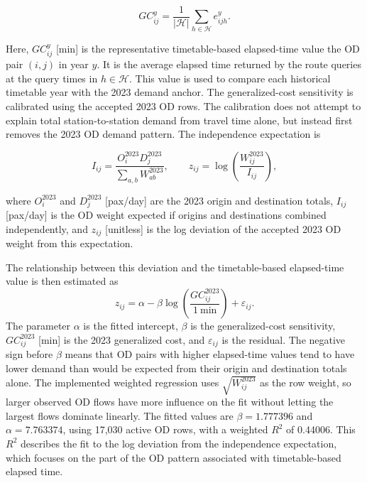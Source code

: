 \documentclass[preprint,12pt]{elsarticle}
\begin{document}
\begin{equation}
GC^y_{ij}=
\frac{1}{|\mathcal{H}|}
\sum_{h\in \mathcal{H}} e^y_{ijh}.
\label{eq:historical-generalized-cost}
\end{equation}

Here, $GC^y_{ij}$ [min] is the representative timetable-based elapsed-time value the OD pair $(i,j)$ in year $y$. It is the average elapsed time returned by the route queries at the query times in $h\in\mathcal{H}$. This value is used to compare each historical timetable year with the 2023 demand anchor. The generalized-cost sensitivity is calibrated using the accepted 2023 OD rows. The calibration does not attempt to explain total station-to-station demand from travel time alone, but instead first removes the 2023 OD demand pattern. The independence expectation is

\begin{equation}
  I_{ij}=\frac{O^{2023}_iD^{2023}_j}{\sum_{a,b}W^{2023}_{ab}},
  \qquad
  z_{ij}=\log\left(\frac{W^{2023}_{ij}}{I_{ij}}\right),
  \label{eq:independence-residual}
\end{equation}

where $O^{2023}_i$ and $D^{2023}_j$ [pax/day] are the 2023 origin and destination totals, $I_{ij}$ [pax/day] is the OD weight expected if origins and destinations combined independently, and $z_{ij}$ [unitless] is the log deviation of the accepted 2023 OD weight from this expectation.

The relationship between this deviation and the timetable-based elapsed-time value is then estimated as
\begin{equation}
  z_{ij}
  =
  \alpha
  -
  \beta\log\left(\frac{GC^{2023}_{ij}}{1\ \mathrm{min}}\right)
  +
  \varepsilon_{ij}.
  \label{eq:gc-beta-calibration}
\end{equation}
The parameter $\alpha$ is the fitted intercept, $\beta$ is the generalized-cost sensitivity, $GC^{2023}_{ij}$ [min] is the 2023 generalized cost, and $\varepsilon_{ij}$ is the residual. The negative sign before $\beta$ means that OD pairs with higher elapsed-time values tend to have lower demand than would be expected from their origin and destination totals alone. The implemented weighted regression uses $\sqrt{W^{2023}_{ij}}$ as the row weight, so larger observed OD flows have more influence on the fit without letting the largest flows dominate linearly. The fitted values are $\beta=1.777396$ and $\alpha=7.763374$, using 17,030 active OD rows, with a weighted $R^2$ of 0.44006. This $R^2$ describes the fit to the log deviation from the independence expectation, which focuses on the part of the OD pattern associated with timetable-based elapsed time.
\end{document}
